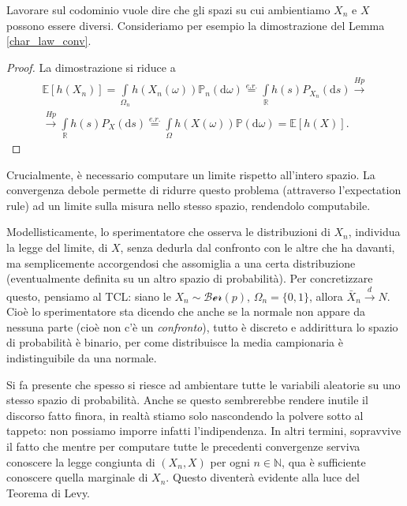Lavorare sul codominio vuole dire che gli spazi su cui ambientiamo $X_n$ e $X$ possono essere diversi. Consideriamo per esempio la dimostrazione del Lemma \ref{char_law_conv}.

\begin{proof}
	La dimostrazione si riduce a 
	\begin{multline}
		\mathbb{E}\left[h(X_n)\right]=
		\int\limits_{\Omega_n} h(X_n(\omega)) \mathbb{P}_n (\mathrm{d} \omega)
		\overset{e.r.}{=}\int\limits_\mathbb{R} h(s) P_{X_n} (\mathrm{d} s)\xrightarrow{Hp} \\ \xrightarrow{Hp}\int\limits_\mathbb{R} h(s) P_{X} (\mathrm{d} s)
		\overset{e.r.}{=}
		\int\limits_{\Omega} h(X(\omega)) \mathbb{P} (\mathrm{d} \omega)
		=\mathbb{E}\left[h(X)\right].		
	\end{multline}
\end{proof}

Crucialmente, è necessario computare un limite rispetto all'intero spazio. La convergenza debole permette di ridurre questo problema (attraverso l'expectation rule) ad un limite sulla misura nello stesso spazio, rendendolo computabile.

\begin{my_remark}
	Modellisticamente, lo sperimentatore che osserva le distribuzioni di $X_n$, individua la legge del limite, di $X$, senza dedurla dal confronto con le altre che ha davanti, ma semplicemente accorgendosi che assomiglia a una certa distribuzione (eventualmente definita su un altro spazio di probabilità). 
	Per concretizzare questo, pensiamo al TCL: siano le $X_n\sim\mathcal{Ber}(p)$, $\Omega_n = \{0,1\}$, allora $\bar{X}_n \xrightarrow{d} N$. 
	Cioè lo sperimentatore sta dicendo che anche se la normale non appare da nessuna parte (cioè non c'è un \textit{confronto}), tutto è discreto e addirittura lo spazio di probabilità è binario, per come distribuisce la media campionaria è indistinguibile da una normale.
\end{my_remark}
\begin{my_remark}
	Si fa presente che spesso si riesce ad ambientare tutte le variabili aleatorie su uno stesso spazio di probabilità. Anche se questo sembrerebbe rendere inutile il discorso fatto finora, in realtà stiamo solo nascondendo la polvere sotto al tappeto: non possiamo imporre infatti l'indipendenza. 
	In altri termini, sopravvive il fatto che mentre per computare tutte le precedenti convergenze serviva conoscere la legge congiunta di $(X_n,X)$ per ogni $n\in\mathbb{{N}}$, qua è sufficiente conoscere quella marginale di $X_n$. Questo diventerà evidente alla luce del Teorema di Levy.
\end{my_remark}

